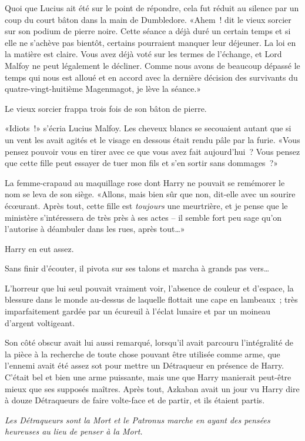 Quoi que Lucius ait été sur le point de répondre, cela fut réduit au silence par un coup du court bâton dans la main de Dumbledore. «Ahem~! dit le vieux sorcier sur son podium de pierre noire. Cette séance a déjà duré un certain temps et si elle ne s'achève pas bientôt, certains pourraient manquer leur déjeuner. La loi en la matière est claire. Vous avez déjà voté sur les termes de l'échange, et Lord Malfoy ne peut légalement le décliner. Comme nous avons de beaucoup dépassé le temps qui nous est alloué et en accord avec la dernière décision des survivants du quatre-vingt-huitième Magenmagot, je lève la séance.»

Le vieux sorcier frappa trois fois de son bâton de pierre.

«Idiots~!» s'écria Lucius Malfoy. Les cheveux blancs se secouaient autant que si un vent les avait agités et le visage en dessous était rendu pâle par la furie. «Vous pensez pouvoir vous en tirer avec ce que vous avez fait aujourd'hui~? Vous pensez que cette fille peut essayer de tuer mon fils et s'en sortir sans dommages~?»

La femme-crapaud au maquillage rose dont Harry ne pouvait se remémorer le nom se leva de son siège. «Allons, mais bien sûr que non, dit-elle avec un sourire écœurant. Après tout, cette fille est \emph{toujours} une meurtrière, et je pense que le ministère s'intéressera de très près à ses actes -- il semble fort peu sage qu'on l'autorise à déambuler dans les rues, après tout…»

Harry en eut assez.

Sans finir d'écouter, il pivota sur ses talons et marcha à grands pas vers…

L'horreur que lui seul pouvait vraiment voir, l'absence de couleur et d'espace, la blessure dans le monde au-dessus de laquelle flottait une cape en lambeaux~; très imparfaitement gardée par un écureuil à l'éclat lunaire et par un moineau d'argent voltigeant.

Son côté obscur avait lui aussi remarqué, lorsqu'il avait parcouru l'intégralité de la pièce à la recherche de toute chose pouvant être utilisée comme arme, que l'ennemi avait été assez sot pour mettre un Détraqueur en présence de Harry. C'était bel et bien une arme puissante, mais une que Harry manierait peut-être mieux que ses supposés maîtres. Après tout, Azkaban avait un jour vu Harry dire à douze Détraqueurs de faire volte-face et de partir, et ils étaient partis.

\emph{Les Détraqueurs sont la Mort et le Patronus marche en ayant des pensées heureuses au lieu de penser à la Mort.}

